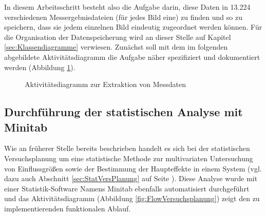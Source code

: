 \documentclass[
fontsize=10pt, 
listof = totoc,
parskip = half	
]{report}
\begin{document}
\noindent In diesem Arbeitsschritt besteht also die Aufgabe darin, diese Daten in 13.224 verschiedenen Messergebnisdateien (für jedes Bild eine) zu finden und so zu speichern, dass sie jedem einzelnen Bild eindeutig zugeordnet werden können. Für die Organisation der Datenspeicherung wird an dieser Stelle auf Kapitel \ref{sec:Klassendiagramme} verwiesen. Zunächst soll mit dem im folgenden abgebildete Aktivitätsdiagramm die Aufgabe näher spezifiziert und dokumentiert werden (Abbildung \ref{fig:FlowDatenextraktion}).

\begin{figure}[H]
	\centering
	\caption{Aktivitätsdiagramm zur Extraktion von Messdaten}
	\label{fig:FlowDatenextraktion}
\end{figure}

\subsection{Durchführung der statistischen Analyse mit Minitab}
\label{subsec:FlowDoeMinitab}
Wie an früherer Stelle bereits beschrieben handelt es sich bei der statistischen Versuchsplanung um eine statistische Methode zur multivariaten Untersuchung von Einflussgrößen sowie der Bestimmung der Haupteffekte in einem System (vgl. dazu auch Abschnitt \ref{sec:StatVersPlanung} auf Seite \pageref{sec:StatVersPlanung}). Diese Analyse wurde mit einer Statistik-Software Namens Minitab ebenfalls automatisiert durchgeführt und das Aktivitätsdiagramm (Abbildung \ref{fig:FlowVersuchsplanung}) zeigt den zu implementierenden funktionalen Ablauf.
\end{document}
